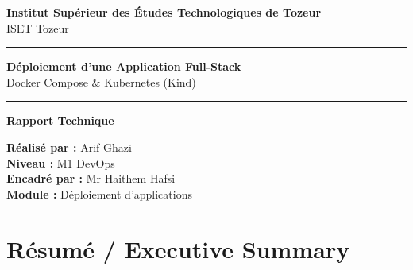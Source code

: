 \documentclass[11pt,a4paper,oneside]{report}
\begin{document}
\begin{titlepage}
\centering


\vspace{0.5cm}

{\large \textbf{Institut Supérieur des Études Technologiques de Tozeur}}\\
{\small ISET Tozeur}

\vspace{1.2cm}

\noindent\rule{\textwidth}{1.5pt}

\vspace{0.5cm}

{\Huge \bfseries Déploiement d’une Application Full-Stack}\\
{\Large Docker Compose \& Kubernetes (Kind)}

\vspace{0.5cm}

\noindent\rule{\textwidth}{1.5pt}

\vspace{1.5cm}


\vspace{1.5cm}

{\Large \textbf{Rapport Technique}}

\vspace{1.5cm}

\large
\Large \textbf{Réalisé par :} Arif Ghazi \\
\textbf{Niveau :} M1 DevOps \\
\textbf{Encadré par :} Mr Haithem Hafsi \\
\textbf{Module :} Déploiement d’applications

\vfill

\end{titlepage}

\tableofcontents
\newpage

\onehalfspacing

\chapter{Résumé / Executive Summary}
\end{document}
